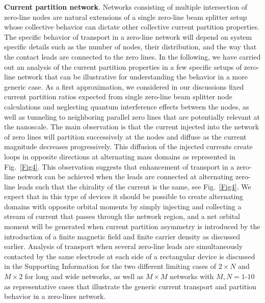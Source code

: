\documentclass[journal=nalefd,manuscript=communication]{achemso}
\begin{document}
\textbf{Current partition network}.
Networks consisting of multiple intersection of zero-line nodes are natural extensions of a single zero-line beam splitter setup whose collective behavior can dictate other collective current partition properties. The specific behavior of transport in a zero-line network will depend on system specific details such as the number of nodes, their distribution, and the way that the contact leads are connected to the zero lines. In the following, we have carried out an analysis of the current partition properties in a few specific setups of zero-line network that can be illustrative for understanding the behavior in a more generic case. As a first approximation, we considered in our discussions fixed current partition ratios expected from single zero-line beam splitter node calculations and neglecting quantum interference effects between the nodes, as well as tunneling to neighboring parallel zero lines that are potentially relevant at the nanoscale. The main observation is that the current injected into the network of zero lines will partition successively at the nodes and diffuse as the current magnitude decreases progressively.
This diffusion of the injected currents create loops in opposite directions at alternating mass domains as represented in Fig.~\ref{Fig4}. This observation suggests that enhancement of transport in a zero-line network can be achieved when the leads are connected at alternating zero-line leads such that the chirality of the current is the same, see Fig.~\ref{Fig4}. We expect that in this type of devices it should be possible to create alternating domains with opposite orbital moments by simply injecting and collecting a stream of current that passes through the network region, and a net orbital moment will be generated when current partition asymmetry is introduced by the introduction of a finite magnetic field and finite carrier density as discussed earlier. Analysis of transport when several zero-line leads are simultaneously contacted by the same electrode at each side of a rectangular device is discussed in the Supporting Information for the two different limiting cases of $2\times N$ and $M \times 2$ for long and wide networks, as well as $M \times M$ networks with $M,N=1$-$10$ as representative cases that illustrate the generic current transport and 
partition behavior in a zero-lines network.
\end{document}
